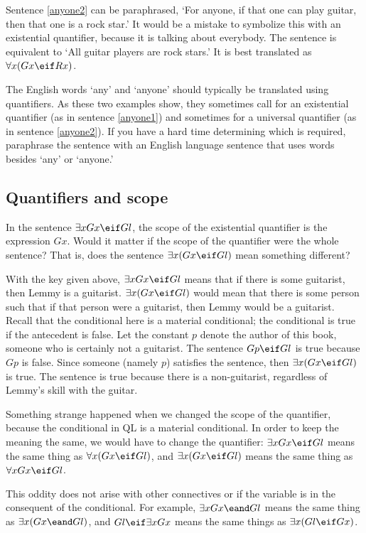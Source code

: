 Sentence \ref{anyone2} can be paraphrased, `For anyone, if that one can play guitar, then that one is a rock star.' It would be a mistake to symbolize this with an existential quantifier, because it is talking about everybody. The sentence is equivalent to `All guitar players are rock stars.' It is best translated as $\forall x(Gx \eif Rx)$.

The English words `any' and `anyone' should typically be translated using quantifiers. As these two examples show, they sometimes call for an existential quantifier (as in sentence \ref{anyone1}) and sometimes for a universal quantifier (as in sentence \ref{anyone2}). If you have a hard time determining which is required, paraphrase the sentence with an English language sentence that uses words besides `any' or `anyone.'


\subsection{Quantifiers and scope}

In the sentence $\exists x Gx \eif Gl$, the scope of the existential quantifier is the expression $Gx$. Would it matter if the scope of the quantifier were the whole sentence? That is, does the sentence $\exists x (Gx \eif Gl)$ mean something different?

With the key given above, $\exists x Gx \eif Gl$ means that if there is some guitarist, then Lemmy is a guitarist. $\exists x (Gx \eif Gl)$ would mean that there is some person such that if that person were a guitarist, then Lemmy would be a guitarist. Recall that the conditional here is a material conditional; the conditional is true if the antecedent is false. Let the constant $p$ denote the author of this book, someone who is certainly not a guitarist. The sentence $Gp \eif Gl$ is true because $Gp$ is false. Since someone (namely $p$) satisfies the sentence, then $\exists x (Gx \eif Gl)$ is true. The sentence is true because there is a non-guitarist, regardless of Lemmy's skill with the guitar.

Something strange happened when we changed the scope of the quantifier, because the conditional in QL is a material conditional. In order to keep the meaning the same, we would have to change the quantifier: $\exists x Gx \eif Gl$ means the same thing as $\forall x (Gx \eif Gl)$, and $\exists x (Gx \eif Gl)$ means the same thing as $\forall x Gx \eif Gl$.

This oddity does not arise with other connectives or if the variable is in the consequent of the conditional. For example, $\exists x Gx \eand Gl$ means the same thing as $\exists x (Gx \eand Gl)$, and $Gl \eif \exists x Gx$ means the same things as $\exists x(Gl \eif Gx)$.


